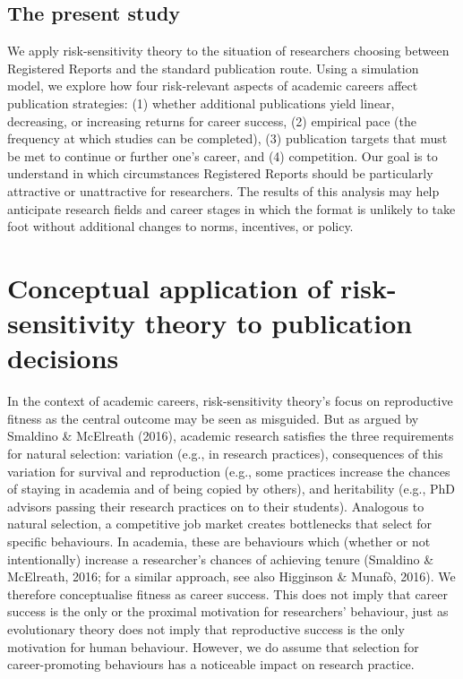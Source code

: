 \documentclass[
  british,
  a4paper,
  ,man,floatsintext]{apa6}
\begin{document}
\subsection{The present study}\label{the-present-study}

We apply risk-sensitivity theory to the situation of researchers choosing between Registered Reports and the standard publication route.
Using a simulation model, we explore how four risk-relevant aspects of academic careers affect publication strategies:
(1) whether additional publications yield linear, decreasing, or increasing returns for career success, (2) empirical pace (the frequency at which studies can be completed), (3) publication targets that must be met to continue or further one's career, and (4) competition.
Our goal is to understand in which circumstances Registered Reports should be particularly attractive or unattractive for researchers.
The results of this analysis may help anticipate research fields and career stages in which the format is unlikely to take foot without additional changes to norms, incentives, or policy.

\section{Conceptual application of risk-sensitivity theory to publication decisions}\label{conceptual-application-of-risk-sensitivity-theory-to-publication-decisions}

In the context of academic careers, risk-sensitivity theory's focus on reproductive fitness as the central outcome may be seen as misguided.
But as argued by Smaldino \& McElreath (2016), academic research satisfies the three requirements for natural selection: variation (e.g., in research practices), consequences of this variation for survival and reproduction (e.g., some practices increase the chances of staying in academia and of being copied by others), and heritability (e.g., PhD advisors passing their research practices on to their students).
Analogous to natural selection, a competitive job market creates bottlenecks that select for specific behaviours.
In academia, these are behaviours which (whether or not intentionally) increase a researcher's chances of achieving tenure (Smaldino \& McElreath, 2016; for a similar approach, see also Higginson \& Munafò, 2016).
We therefore conceptualise fitness as career success.
This does not imply that career success is the only or the proximal motivation for researchers' behaviour, just as evolutionary theory does not imply that reproductive success is the only motivation for human behaviour.
However, we do assume that selection for career-promoting behaviours has a noticeable impact on research practice.
\end{document}
